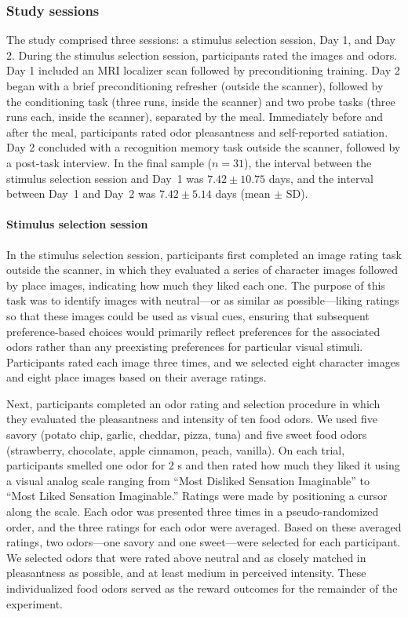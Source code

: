 \documentclass[12pt,letterpaper]{article}
\begin{document}
\par\endgroup\bigskip


\subsubsection*{Study sessions}

The study comprised three sessions: a stimulus selection session, Day 1, and Day 2. During the stimulus selection session, participants rated the images and odors. Day 1 included an MRI localizer scan followed by preconditioning training. Day 2 began with a brief preconditioning refresher (outside the scanner), followed by the conditioning task (three runs, inside the scanner) and two probe tasks (three runs each, inside the scanner), separated by the meal. Immediately before and after the meal, participants rated odor pleasantness and self-reported satiation. Day 2 concluded with a recognition memory task outside the scanner, followed by a post-task interview. In the final sample ($n = 31$), the interval between the stimulus selection session and Day~1 was \(7.42 \pm 10.75\) days, and the interval between Day~1 and Day~2 was \(7.42 \pm 5.14\) days (mean $\pm$ SD).

\paragraph*{Stimulus selection session}

In the stimulus selection session, participants first completed an image rating task outside the scanner, in which they evaluated a series of character images followed by place images, indicating how much they liked each one. The purpose of this task was to identify images with neutral---or as similar as possible---liking ratings so that these images could be used as visual cues, ensuring that subsequent preference-based choices would primarily reflect preferences for the associated odors rather than any preexisting preferences for particular visual stimuli. Participants rated each image three times, and we selected eight character images and eight place images based on their average ratings.

Next, participants completed an odor rating and selection procedure in which they evaluated the pleasantness and intensity of ten food odors. We used five savory (potato chip, garlic, cheddar, pizza, tuna) and five sweet food odors (strawberry, chocolate, apple cinnamon, peach, vanilla). On each trial, participants smelled one odor for 2 s and then rated how much they liked it using a visual analog scale ranging from “Most Disliked Sensation Imaginable” to “Most Liked Sensation Imaginable.” Ratings were made by positioning a cursor along the scale. Each odor was presented three times in a pseudo-randomized order, and the three ratings for each odor were averaged. Based on these averaged ratings, two odors—one savory and one sweet—were selected for each participant. We selected odors that were rated above neutral and as closely matched in pleasantness as possible, and at least medium in perceived intensity. These individualized food odors served as the reward outcomes for the remainder of the experiment.
\end{document}

